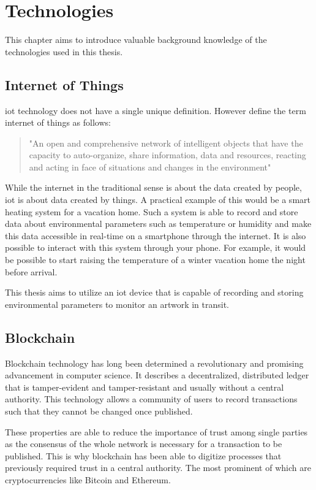 \chapter{Technologies}
This chapter aims to introduce valuable background knowledge of the technologies used in this thesis.

\section{Internet of Things}
\gls{iot} technology does not have a single unique definition. However \textcite{iot} define the term internet of things as follows:
\begin{quote}
    "An open and comprehensive network of intelligent objects that have the capacity to auto-organize, share information, data and resources, reacting and acting in face of situations and changes in the environment"
\end{quote}
While the internet in the traditional sense is about the data created by people, \gls{iot} is about data created by things. A practical example of this would be a smart heating system for a vacation home. Such a system is able to record and store data about environmental parameters such as temperature or humidity and make this data accessible in real-time on a smartphone through the internet. It is also possible to interact with this system through your phone. For example, it would be possible to start raising the temperature of a winter vacation home the night before arrival.

This thesis aims to utilize an \gls{iot} device that is capable of recording and storing environmental parameters to monitor an artwork in transit.

\section{Blockchain}
Blockchain technology has long been determined a revolutionary and promising advancement in computer science. It describes a decentralized, distributed ledger that is tamper-evident and tamper-resistant and usually without a central authority. This technology allows a community of users to record transactions such that they cannot be changed once published. \parencite{blockchainoverview}

These properties are able to reduce the importance of trust among single parties as the consensus of the whole network is necessary for a transaction to be published. This is why blockchain has been able to digitize processes that previously required trust in a central authority. The most prominent of which are cryptocurrencies like Bitcoin and Ethereum. \cite{bitcoin, ethereum}

